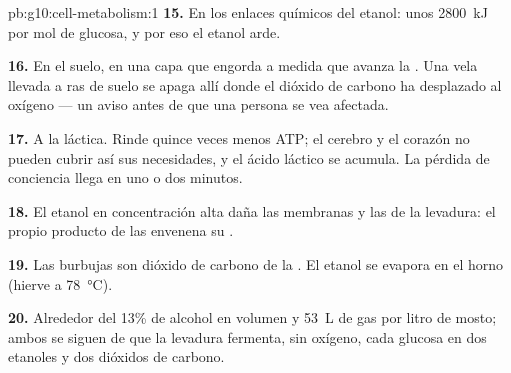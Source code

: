 \begin{solution}{pb:g10:cell-metabolism:1}
\textbf{15.} En los enlaces químicos del etanol: unos \qty{2800}{kJ}
por mol de glucosa, y por eso el etanol arde.

\textbf{16.} En el suelo, en una capa que engorda a medida que avanza
la . Una vela llevada a ras de suelo se apaga allí donde el
dióxido de carbono ha desplazado al oxígeno --- un aviso antes de que
una persona se vea afectada.

\textbf{17.} A la  láctica. Rinde quince veces menos ATP;
el cerebro y el corazón no pueden cubrir así sus necesidades, y el
ácido láctico se acumula. La pérdida de conciencia llega en uno o dos
minutos.

\textbf{18.} El etanol en concentración alta daña las membranas y las
 de la levadura: el propio producto de las  envenena su
.

\textbf{19.} Las burbujas son dióxido de carbono de la . El
etanol se evapora en el horno (hierve a \qty{78}{\celsius}).

\textbf{20.} Alrededor del 13\% de alcohol en volumen y \qty{53}{L} de
gas por litro de mosto; ambos se siguen de que la levadura fermenta,
sin oxígeno, cada glucosa en dos etanoles y dos dióxidos de carbono.
\end{solution}
